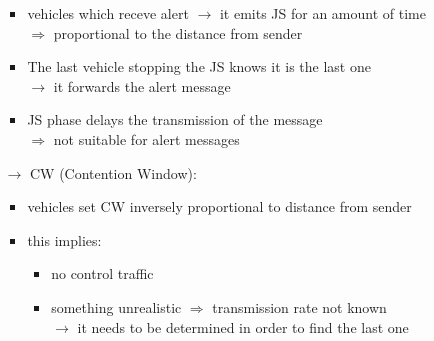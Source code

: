 \begin{itemize}
\begin{itemize}
\begin{itemize}
            \item vehicles which receve alert $\rightarrow$ it emits JS for
            an amount of time\\ $\Rightarrow$ proportional to the distance from sender
            \item The last vehicle stopping the JS knows it is the last one\\
            $\rightarrow$ it forwards the alert message
            \item JS phase delays the transmission of the message\\
            $\Rightarrow$ not suitable for alert messages
        \end{itemize}
        \item[$\rightarrow$] CW (Contention Window):
        \begin{itemize}
            \item vehicles set CW inversely proportional to distance from sender
            \item this implies:
            \begin{itemize}
                \item no control traffic
                \item something unrealistic $\Rightarrow$ transmission rate not known\\
                $\rightarrow$ it needs to be determined in order to find the last one
            \end{itemize}
        \end{itemize}
    \end{itemize}
\end{itemize}

